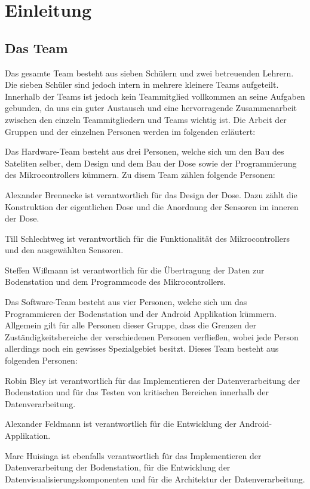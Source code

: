 \section{Einleitung}
\subsection{Das Team}

Das gesamte Team besteht aus sieben Schülern und zwei betreuenden Lehrern. Die sieben Schüler sind jedoch intern in mehrere kleinere Teams aufgeteilt. Innerhalb der Teams ist jedoch kein Teammitglied vollkommen an seine Aufgaben gebunden, da uns ein guter Austausch und eine hervorragende Zusammenarbeit zwischen den einzeln Teammitgliedern und Teams wichtig ist. Die Arbeit der Gruppen und der einzelnen Personen werden im folgenden erläutert:

Das Hardware-Team besteht aus drei Personen, welche sich um den Bau des Sateliten selber, dem Design und dem Bau der Dose sowie der Programmierung des Mikrocontrollers kümmern. Zu disem Team zählen folgende Personen:

Alexander Brennecke ist verantwortlich für das Design der Dose. Dazu zählt die Konstruktion der eigentlichen Dose und die Anordnung der Sensoren im inneren der Dose.

Till Schlechtweg ist verantwortlich für die Funktionalität des Mikrocontrollers und den ausgewählten Sensoren.

Steffen Wißmann ist verantwortlich für die Übertragung der Daten zur Bodenstation und dem Programmcode des Mikrocontrollers.

Das Software-Team besteht aus vier Personen, welche sich um das Programmieren der Bodenstation und der Android Applikation kümmern. Allgemein gilt für alle Personen dieser Gruppe, dass die Grenzen der Zuständigkeitsbereiche der verschiedenen Personen verfließen, wobei jede Person allerdings noch ein gewisses Spezialgebiet besitzt. Dieses Team besteht aus folgenden Personen:

Robin Bley ist verantwortlich für das Implementieren der Datenverarbeitung der Bodenstation und für das Testen von kritischen Bereichen innerhalb der Datenverarbeitung.

Alexander Feldmann ist verantwortlich für die Entwicklung der Android-Applikation.

Marc Huisinga ist ebenfalls verantwortlich für das Implementieren der Datenverarbeitung der Bodenstation, für die Entwicklung der Datenvisualisierungskomponenten und für die Architektur der Datenverarbeitung.


